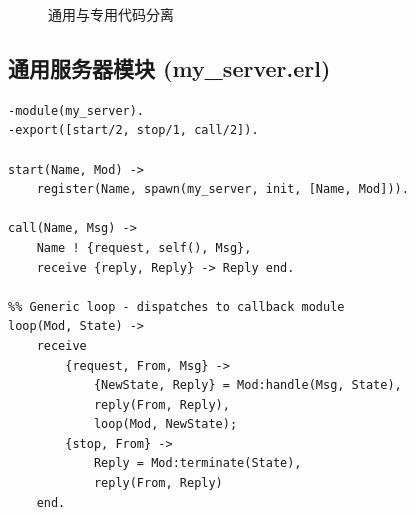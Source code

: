 \documentclass[a4paper,11pt]{article}
\begin{document}
\begin{figure}[H]
\centering
{}
\caption{通用与专用代码分离}
\label{fig:separation}
\end{figure}

\subsection{通用服务器模块 (my\_server.erl)}

\begin{lstlisting}[style=erlangstyle, caption={my\_server.erl --- 自定义通用服务器}]
-module(my_server).
-export([start/2, stop/1, call/2]).

start(Name, Mod) ->
    register(Name, spawn(my_server, init, [Name, Mod])).

call(Name, Msg) ->
    Name ! {request, self(), Msg},
    receive {reply, Reply} -> Reply end.

%% Generic loop - dispatches to callback module
loop(Mod, State) ->
    receive
        {request, From, Msg} ->
            {NewState, Reply} = Mod:handle(Msg, State),
            reply(From, Reply),
            loop(Mod, NewState);
        {stop, From} ->
            Reply = Mod:terminate(State),
            reply(From, Reply)
    end.
\end{lstlisting}
\end{document}
